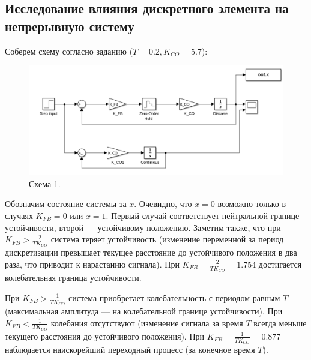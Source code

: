 \documentclass[a4paper, 14pt]{extarticle}
\theoremstyle{definition}
\theoremstyle{plain}
\theoremstyle{remark}
\begin{document}
\subsection{Исследование влияния дискретного элемента на непрерывную систему}
Соберем схему согласно заданию ($T=0.2, K_{CO}=5.7$):
\begin{figure}
    [H]
    \centering
    \includegraphics[width=\textwidth]{images/scheme_1.png}
    \caption{Схема 1.}
    \label{fig:scheme_1}
\end{figure}

Обозначим состояние системы за $x$. Очевидно, что $\dot{x}=0$ возможно только в случаях $K_{FB}=0$ или $x=1$. Первый случай соответствует нейтральной границе устойчивости, второй --- устойчивому положению. Заметим также, что при $K_{FB}>\frac{2}{TK_{CO}}$ система теряет устойчивость (изменение переменной за период дискретизации превышает текущее расстояние до устойчивого положения в два раза, что приводит к нарастанию сигнала). При $K_{FB}=\frac{2}{TK_{CO}}=1.754$ достигается колебательная граница устойчивости.

При $K_{FB}>\frac{1}{TK_{CO}}$ система приобретает колебательность с периодом равным $T$ (максимальная амплитуда --- на колебательной границе устойчивости). При $K_{FB}<\frac{1}{TK_{CO}}$ колебания отсутствуют (изменение сигнала за время $T$ всегда меньше текущего расстояния до устойчивого положения). При $K_{FB}=\frac{1}{TK_{CO}}=0.877$ наблюдается наискорейший переходный процесс (за конечное время $T$).
\end{document}
